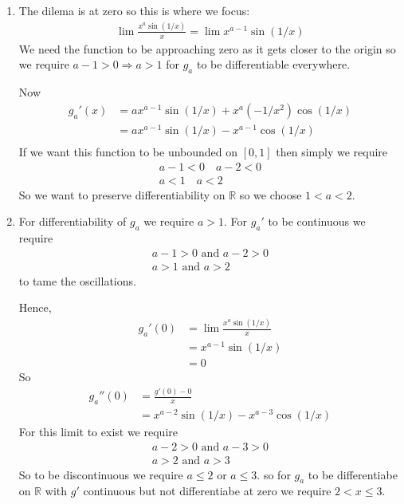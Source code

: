 \begin{enumerate}[label=(\alph*)]
    \item 
    The dilema is at zero so this is where we focus:
    \begin{align*}
        \lim \frac{x^a \sin(1/x)}{x} = \lim x^{a-1} \sin(1/x)
    \end{align*}
    We need the function to be approaching zero as it gets closer to the 
    origin so we require $a-1>0 \Rightarrow a>1$ for $g_a$ to be differentiable
    everywhere.

    Now 
    \begin{align*}
        g_a'(x) &= ax^{a-1}\sin(1/x)+x^a(-1/x^2)\cos(1/x) \\
                &= ax^{a-1}\sin(1/x)-x^{a-1}\cos(1/x) \\
    \end{align*}
    If we want this function to be unbounded on $[0,1]$ then
    simply we require
    \begin{gather*}
        a-1<0 \quad a-2<0 \\
        a<1    \quad a<2
    \end{gather*} 
    So we want to preserve differentiability on $\mathbb{R}$ so we choose $1<a<2$.

    \item
    For differentiability of $g_a$ we require $a>1$.
    For $g_a'$ to be continuous we require 
    \begin{gather*}
        a-1>0 \text{ and } a-2>0 \\
        a>1 \text{ and } a>2
    \end{gather*}
    to tame the oscillations.

    Hence,
    \begin{align*}
        g_a'(0) &= \lim \frac{x^a \sin(1/x)}{x} \\
                &= x^{a-1} \sin(1/x) \\
                &= 0
    \end{align*}
    So
    \begin{align*}
        g_a''(0) &= \frac{g'(0)-0}{x} \\
                &= x^{a-2} \sin(1/x) - x^{a-3} \cos(1/x)
    \end{align*}
    For this limit to exist we require 
    \begin{gather*}
        a-2>0 \text{ and } a-3>0 \\
        a>2 \text{ and } a>3
    \end{gather*}
    So to be discontinuous we require $a\leq 2$ or $a\leq 3$.
    so for $g_a$ to be differentiabe on $\mathbb{R}$ with 
    $g'$ continuous but not differentiabe at zero we require $2<x\leq 3$.


\end{enumerate}
